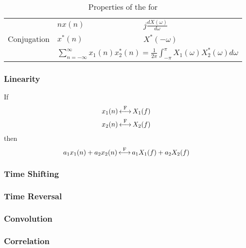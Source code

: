\begin{table}[h!]
\begin{tabular}{lll}
    \nameref{subsubsec:FourierTransformProperties-DifferentiationFrequencyDomain} & $n x(n)$ & $j \frac{dX(\omega)}{d\omega}$ \\
    Conjugation & $x^{*}(n)$ & $X^{*}(-\omega)$ \\
    \nameref{subsubsec:FourierTransformProperties-ParsevalsTheorem} & \multicolumn{2}{c}{$\sum_{n=-\infty}^{\infty} x_{1}(n)x_{2}^{*}(n) = \frac{1}{2 \pi} \int_{-\pi}^{\pi}X_{1}(\omega)X_{2}^{*}(\omega) d\omega$} \\
    \bottomrule
  \end{tabular}
  \caption{Properties of the  for }
  \label{tab:FourierTransformProperties}
\end{table}

\subsubsection{Linearity}\label{subsubsec:FourierTransformProperties-Linearity}
If
\begin{equation*}
  \begin{aligned}
    x_{1}(n) &\operatorname{\overset{F}{\longleftrightarrow}} X_{1}(f) \\
    x_{2}(n) &\operatorname{\overset{F}{\longleftrightarrow}} X_{2}(f) \\
  \end{aligned}
\end{equation*}
then
\begin{equation}\label{eq:FourierTransformProperties-Linearity}
  a_{1}x_{1}(n) + a_{2}x_{2}(n) \operatorname{\overset{F}{\longleftrightarrow}} a_{1}X_{1}(f) + a_{2}X_{2}(f)
\end{equation}

\subsubsection{Time Shifting}\label{subsubsec:FourierTransformProperties-TimeShifting}
\subsubsection{Time Reversal}\label{subsubsec:FourierTransformProperties-TimeReversal}
\subsubsection{Convolution}\label{subsubsec:FourierTransformProperties-Convolution}
\subsubsection{Correlation}\label{subsubsec:FourierTransformProperties-Correlation}
